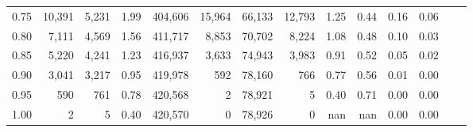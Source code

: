 \begin{tabular}{rrrrrrrrrrrrrr}
0.75 &  10,391 &  5,231 &    1.99 &  404,606 &   15,964 &  66,133 &  12,793 &  1.25 &  0.44 &  0.16 &      0.06 \\
0.80 &   7,111 &  4,569 &    1.56 &  411,717 &    8,853 &  70,702 &   8,224 &  1.08 &  0.48 &  0.10 &      0.03 \\
0.85 &   5,220 &  4,241 &    1.23 &  416,937 &    3,633 &  74,943 &   3,983 &  0.91 &  0.52 &  0.05 &      0.02 \\
0.90 &   3,041 &  3,217 &    0.95 &  419,978 &      592 &  78,160 &     766 &  0.77 &  0.56 &  0.01 &      0.00 \\
0.95 &     590 &    761 &    0.78 &  420,568 &        2 &  78,921 &       5 &  0.40 &  0.71 &  0.00 &      0.00 \\
1.00 &       2 &      5 &    0.40 &  420,570 &        0 &  78,926 &       0 &   nan &   nan &  0.00 &      0.00 \\
\bottomrule
\end{tabular}
